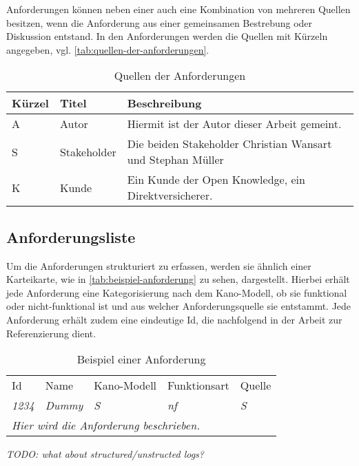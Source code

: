 Anforderungen können neben einer auch eine Kombination von mehreren Quellen besitzen, wenn die Anforderung aus einer gemeinsamen Bestrebung oder Diskussion entstand. In den Anforderungen werden die Quellen mit Kürzeln angegeben, vgl. \autoref{tab:quellen-der-anforderungen}.

\begin{table}[H]
\begin{tabular}{ |p{1.15cm}|p{1.9cm}|p{10.45cm}| }
	\hline
	Kürzel & Titel & Beschreibung \\
	\hline
	A & Autor & Hiermit ist der Autor dieser Arbeit gemeint. \\
	\hline
	S & Stakeholder & Die beiden Stakeholder Christian Wansart und Stephan Müller \\
	\hline
	K & Kunde & Ein Kunde der Open Knowledge, ein Direktversicherer. \\
	\hline
\end{tabular}
 \captionsetup{justification=centering}
  \caption{Quellen der Anforderungen}
   \label{tab:quellen-der-anforderungen}
\end{table}
	
\subsection{Anforderungsliste}

Um die Anforderungen strukturiert zu erfassen, werden sie ähnlich einer Karteikarte, wie in \autoref{tab:beispiel-anforderung} zu sehen, dargestellt. Hierbei erhält jede Anforderung eine Kategorisierung nach dem Kano-Modell, ob sie funktional oder nicht-funktional ist und aus welcher Anforderungsquelle sie entstammt. Jede Anforderung erhält zudem eine eindeutige Id, die nachfolgend in der Arbeit zur Referenzierung dient.

\begin{table}[H]
\begin{tabular}{ |p{1.25cm}|p{5.5cm}|p{2.25cm}|p{2.1cm}|p{1.25cm}| }
\hline
Id            & Name          & Kano-Modell   & Funktionsart  & Quelle        \\
\textit{1234} & \textit{Dummy} & \textit{S} & \textit{nf} & \textit{S} \\
\hline
\multicolumn{5}{|l|}{\textit{Hier wird die Anforderung beschrieben.}} \\
\hline
\end{tabular}
 \captionsetup{justification=centering}
  \caption{Beispiel einer Anforderung}
   \label{tab:beispiel-anforderung}
\end{table}




\textit{\color{red}TODO: what about structured/unstructed logs?}